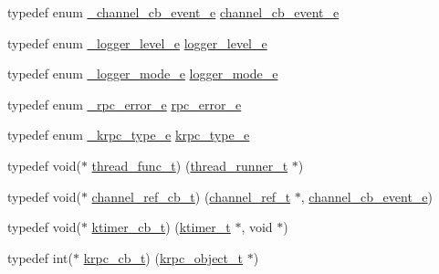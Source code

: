 \begin{DoxyCompactItemize}
\item 
typedef enum \hyperlink{a00047_a2217ac7363dbae279d056a361d122915_a2217ac7363dbae279d056a361d122915}{\+\_\+channel\+\_\+cb\+\_\+event\+\_\+e} \hyperlink{a00047_aaf2cba5d4035f3d56350b59342ebf65c_aaf2cba5d4035f3d56350b59342ebf65c}{channel\+\_\+cb\+\_\+event\+\_\+e}
\item 
typedef enum \hyperlink{a00047_a4e764c733cf98ee587ca17412fca9148_a4e764c733cf98ee587ca17412fca9148}{\+\_\+logger\+\_\+level\+\_\+e} \hyperlink{a00047_afe883c56a5fd8d7794a3dd36780ed9d0_afe883c56a5fd8d7794a3dd36780ed9d0}{logger\+\_\+level\+\_\+e}
\item 
typedef enum \hyperlink{a00047_a95d677e6aef6e1699b92848e4497c23a_a95d677e6aef6e1699b92848e4497c23a}{\+\_\+logger\+\_\+mode\+\_\+e} \hyperlink{a00047_aa72cd8c306f50bee7c64e1daa1c1f3f4_aa72cd8c306f50bee7c64e1daa1c1f3f4}{logger\+\_\+mode\+\_\+e}
\item 
typedef enum \hyperlink{a00047_a5a9afdfc8281994f0692b49499d731bf_a5a9afdfc8281994f0692b49499d731bf}{\+\_\+rpc\+\_\+error\+\_\+e} \hyperlink{a00047_aba1e847dfcabe31256c7f60abe0272a6_aba1e847dfcabe31256c7f60abe0272a6}{rpc\+\_\+error\+\_\+e}
\item 
typedef enum \hyperlink{a00047_aa250e66ac76155c15e3e1d24d0431931_aa250e66ac76155c15e3e1d24d0431931}{\+\_\+krpc\+\_\+type\+\_\+e} \hyperlink{a00047_a6bca3ecacad337637254bb43ab58a0b6_a6bca3ecacad337637254bb43ab58a0b6}{krpc\+\_\+type\+\_\+e}
\item 
typedef void($\ast$ \hyperlink{a00047_a46bcd8005e5d86fdbc6be5af0a77156c_a46bcd8005e5d86fdbc6be5af0a77156c}{thread\+\_\+func\+\_\+t}) (\hyperlink{a00047_a9054159cde2f926ef61c28ce1e555199_a9054159cde2f926ef61c28ce1e555199}{thread\+\_\+runner\+\_\+t} $\ast$)
\item 
typedef void($\ast$ \hyperlink{a00047_ae296ec4d1ce108960de8dcc423956a1d_ae296ec4d1ce108960de8dcc423956a1d}{channel\+\_\+ref\+\_\+cb\+\_\+t}) (\hyperlink{a00047_a151271c9d188ef28d4d24bb81dcc1263_a151271c9d188ef28d4d24bb81dcc1263}{channel\+\_\+ref\+\_\+t} $\ast$, \hyperlink{a00047_aaf2cba5d4035f3d56350b59342ebf65c_aaf2cba5d4035f3d56350b59342ebf65c}{channel\+\_\+cb\+\_\+event\+\_\+e})
\item 
typedef void($\ast$ \hyperlink{a00047_a2333fd0f2c3a85faf586300ca40deed4_a2333fd0f2c3a85faf586300ca40deed4}{ktimer\+\_\+cb\+\_\+t}) (\hyperlink{a00047_a846172ea4e8a86449eca41a3d8e074b7_a846172ea4e8a86449eca41a3d8e074b7}{ktimer\+\_\+t} $\ast$, void $\ast$)
\item 
typedef int($\ast$ \hyperlink{a00047_a06bb708c1b97445d3a5d0c1b32ad2ab6_a06bb708c1b97445d3a5d0c1b32ad2ab6}{krpc\+\_\+cb\+\_\+t}) (\hyperlink{a00047_a9c07dfc8c3b965f75b09f82fdb1bbb1e_a9c07dfc8c3b965f75b09f82fdb1bbb1e}{krpc\+\_\+object\+\_\+t} $\ast$)

\end{DoxyCompactItemize}
